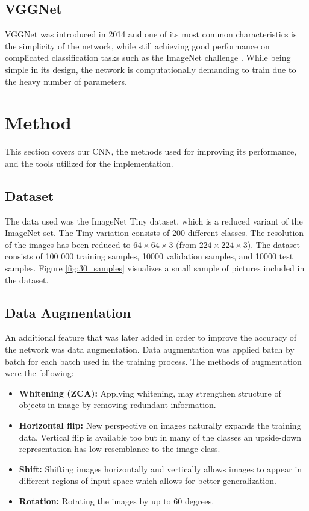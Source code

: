 \documentclass{kthreport}
\begin{document}
\subsection{VGGNet}
VGGNet was introduced in 2014 and one of its most common characteristics is the simplicity of the network, while still achieving good performance on complicated classification tasks such as the ImageNet challenge \cite{simonyan2014very}. While being simple in its design, the network is computationally demanding to train due to the heavy number of parameters.


\section{Method}
This section covers our CNN, the methods used for improving its performance, and the tools utilized for the implementation.

\subsection{Dataset}
The data used was the ImageNet Tiny dataset, which is a reduced variant of the ImageNet set. The Tiny variation consists of 200 different classes. The resolution of the images has been reduced to $64\times64\times3$ (from  $224\times224\times3$). The dataset consists of 100 000 training samples, 10000 validation samples, and 10000 test samples.
Figure \ref{fig:30_samples} visualizes a small sample of pictures included in the dataset.



\subsection{Data Augmentation}
\label{DataAugmentation}
An additional feature that was later added in order to improve the accuracy of the network was data augmentation. Data augmentation was applied batch by batch for each batch used in the training process. The methods of augmentation were the following:

\begin{itemize}
  \item \textbf{Whitening (ZCA):} Applying whitening, may strengthen structure of objects in image by removing redundant information.
  \item \textbf{Horizontal flip:} New perspective on images naturally expands the training data. Vertical flip is available too but in many of the classes an upside-down representation has low resemblance to the image class.
  \item \textbf{Shift:} Shifting images horizontally and vertically allows images to appear in different regions of input space which allows for better generalization.
  \item \textbf{Rotation:} Rotating the images by up to 60 degrees.
\end{itemize}
\end{document}
